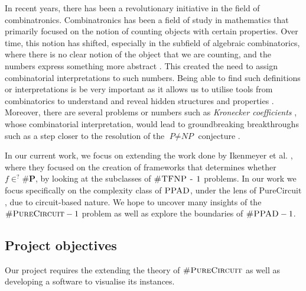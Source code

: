 In recent years, there has been a revolutionary
initiative in the field of combinatronics.
Combinatronics has been a field of study in mathematics that primarily focused on
the notion of counting objects with certain properties. Over time, this notion
has shifted, especially in the subfield of algebraic combinatorics, where
there is no clear notion of the object that we are counting,
and the numbers express something more abstract \cite{pak_WhatCombinatorialInterpretation_2022}.
This created the need to assign combinatorial interpretations to such numbers.
Being able to find such definitions or interpretations is be very important
as it allows us to utilise tools from combinatorics to understand
and reveal hidden structures and properties \cite{pak_WhatCombinatorialInterpretation_2022}. 
Moreover, there are several problems or numbers such as \textit{Kronecker coefficients} \cite{makar_AnalysisKroneckerProduct_1949},
whose combinatorial interpretation, would lead to groundbreaking breakthroughs such as a step closer to the resolution of the $\textit{P} \neq \textit{NP}$
conjecture \cite{ikenmeyer_WhatWhatNot_2022, ikenmeyer_VanishingKroneckerCoefficients_2017}.


In our current work, we focus on extending the work done by
Ikenmeyer et al. \cite{ikenmeyer_WhatWhatNot_2022}, where they focused on the creation of frameworks
that determines whether $f \in^? \textbf{\#P}$, by looking
at the subclasses of $\textsc{\#TFNP - 1}$ problems.
In our work we focus specifically on the complexity class of $\textsc{PPAD}$, under the lens of $\text{PureCircuit}$,
due to circuit-based nature.
We hope to uncover many insights of the $\textsc{\#PureCircuit} -1$ problem 
as well as explore the boundaries of $\textsc{\#PPAD} -1$.



\subsection{Project objectives}

Our project requires the extending the theory of $\textsc{\#PureCircuit}$
as well as developing a software to visualise its instances.


